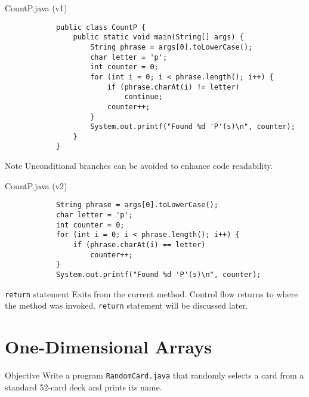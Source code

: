 \documentclass[10pt, compress]{beamer}
\begin{document}
\begin{slide}
	\begin{block}{CountP.java (v1)}
		\begin{verbatim}
			public class CountP {
			    public static void main(String[] args) {
			        String phrase = args[0].toLowerCase();
			        char letter = 'p';
			        int counter = 0;
			        for (int i = 0; i < phrase.length(); i++) {
			            if (phrase.charAt(i) != letter)
			                continue;
			            counter++;
			        }
			        System.out.printf("Found %d 'P'(s)\n", counter);
			    }
			}
		\end{verbatim}
	\end{block}
\end{slide}

\begin{slide}
	\begin{block}{Note}
	Unconditional branches can be avoided to enhance code readability.
	\end{block}
	\begin{block}{CountP.java (v2)}
		\begin{verbatim}
			String phrase = args[0].toLowerCase();
			char letter = 'p';
			int counter = 0;
			for (int i = 0; i < phrase.length(); i++) {
			    if (phrase.charAt(i) == letter)
			        counter++;
			}
			System.out.printf("Found %d 'P'(s)\n", counter);
		\end{verbatim}
	\end{block}
\end{slide}

\begin{slide}
	\begin{block}{\texttt{return} statement}
	Exits from the current method.
	Control flow returns to where the method was invoked.
	\texttt{return} statement will be discussed later.
	\end{block}
\end{slide}

\section{One-Dimensional Arrays}

\begin{slide}
	\begin{block}{Objective}
		Write a program \texttt{RandomCard.java} that randomly selects a card from a standard 52-card deck and prints its name.
	\end{block}
\end{slide}
\end{document}
